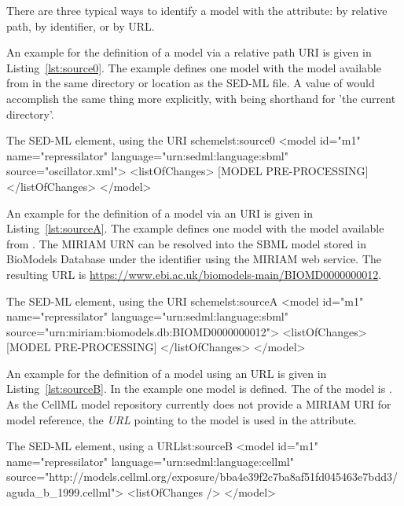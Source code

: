 \begin{blockChanged}
There are three typical ways to identify a model with the  attribute:  by relative path, by identifier, or by URL.

An example for the definition of a model via a relative path URI is given in Listing~\ref{lst:source0}. The example defines one model  with the model  available from  in the same directory or location as the SED-ML file.  A  value of  would accomplish the same thing more explicitly, with  being shorthand for 'the current directory'.

\begin{myXmlLst}{The SED-ML  element, using the URI scheme}{lst:source0}
<model id="m1" name="repressilator" language="urn:sedml:language:sbml" 
	source="oscillator.xml">
	<listOfChanges>
		[MODEL PRE-PROCESSING]
	</listOfChanges>
</model>
\end{myXmlLst}

\end{blockChanged}

An example for the definition of a model via an URI is given in Listing~\ref{lst:sourceA}. The example defines one model  with the model  available from . The MIRIAM URN can be resolved into the SBML model stored in BioModels Database under the identifier  using the MIRIAM web service. The resulting URL is \url{https://www.ebi.ac.uk/biomodels-main/BIOMD0000000012}.

\begin{myXmlLst}{The SED-ML  element, using the URI scheme}{lst:sourceA}
<model id="m1" name="repressilator" language="urn:sedml:language:sbml" 
	source="urn:miriam:biomodels.db:BIOMD0000000012">
	<listOfChanges>
		[MODEL PRE-PROCESSING]
	</listOfChanges>
</model>
\end{myXmlLst}

An example for the definition of a model using an URL is given in Listing~\ref{lst:sourceB}. In the example one model is defined. The  of the model is . As the CellML model repository currently does not provide a MIRIAM URI for model reference, the \emph{URL} pointing to the model is used in the  attribute.

\begin{myXmlLst}{The SED-ML  element, using a URL}{lst:sourceB}
<model id="m1" name="repressilator" language="urn:sedml:language:cellml" 
	source="http://models.cellml.org/exposure/bba4e39f2c7ba8af51fd045463e7bdd3/aguda_b_1999.cellml">
	<listOfChanges />
</model>
\end{myXmlLst}



